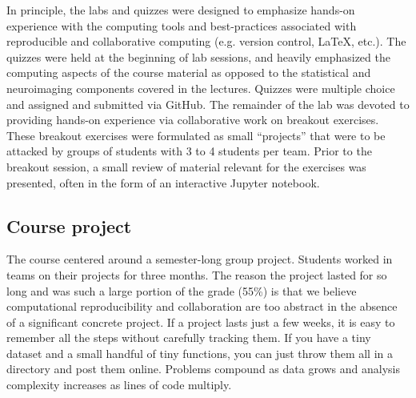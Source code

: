 In principle, the labs and quizzes were designed to emphasize hands-on 
experience with the computing tools and best-practices associated with
reproducible and collaborative computing (e.g. version control, \LaTeX, etc.).
The quizzes were held at the beginning of lab sessions, and heavily emphasized
the computing aspects of the course material as opposed to the statistical and
neuroimaging components covered in the lectures.
Quizzes were multiple choice and assigned and submitted via GitHub.
The remainder of the lab was devoted to providing hands-on experience via
collaborative work on breakout exercises.
These breakout exercises were formulated as small ``projects'' that were to be
attacked by groups of students with 3 to 4 students per team.
Prior to the breakout session, a small review of material relevant for the 
exercises was presented, often in the form of an interactive Jupyter notebook.

\subsection{Course project}\label{project}

The course centered around a semester-long group project.
Students worked in teams on their projects for three months.
The reason the project lasted for so long and was such a large portion of the grade (55\%)
is that we believe computational reproducibility and collaboration
are too abstract in the absence of a significant concrete project.
If a project lasts just a few weeks, it is easy to remember all the steps
without carefully tracking them.
If you have a tiny dataset and a small handful of tiny functions, you can just
throw them all in a directory and post them online.
Problems compound as data grows and analysis complexity increases as lines of
code multiply.


